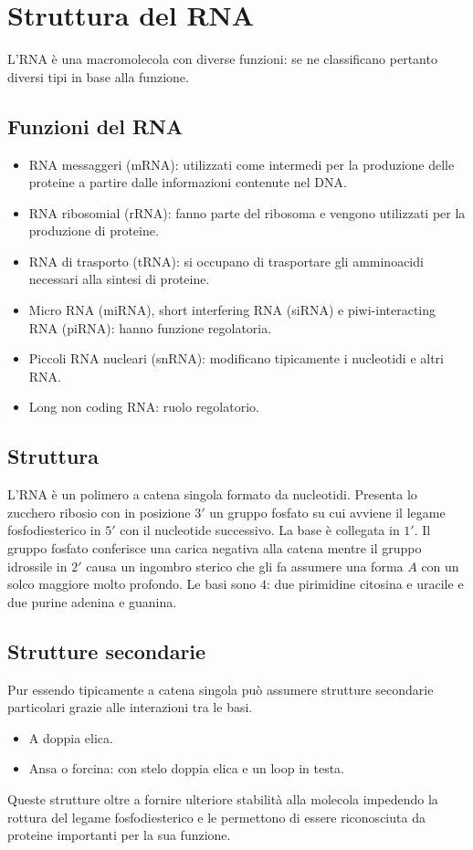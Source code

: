 \section{Struttura del RNA}
L'RNA \`e una macromolecola con diverse funzioni: se ne classificano pertanto diversi tipi in base alla funzione.

	\subsection{Funzioni del RNA}
	\begin{multicols}{2}
		\begin{itemize}
			\item RNA messaggeri (mRNA): utilizzati come intermedi per la produzione delle proteine a partire dalle informazioni contenute nel DNA.
			\item RNA ribosomial (rRNA): fanno parte del ribosoma e vengono utilizzati per la produzione di proteine.
			\item RNA di trasporto (tRNA): si occupano di trasportare gli amminoacidi necessari alla sintesi di proteine.
			\item Micro RNA (miRNA), short interfering RNA (siRNA) e piwi-interacting RNA (piRNA): hanno funzione regolatoria.
			\item Piccoli RNA nucleari (snRNA): modificano tipicamente i nucleotidi e altri RNA.
			\item Long non coding RNA: ruolo regolatorio. 
		\end{itemize}
	\end{multicols}

	\subsection{Struttura}
	L'RNA \`e un polimero a catena singola formato da nucleotidi. 
	Presenta lo zucchero ribosio con in posizione $3'$ un gruppo fosfato su cui avviene il legame fosfodiesterico in $5'$ con il
	nucleotide successivo. 
	La base \`e collegata in $1'$. 
	Il gruppo fosfato conferisce una carica negativa alla catena mentre il gruppo idrossile in $2'$ causa un ingombro sterico che gli fa assumere una forma $A$ con un solco maggiore molto profondo. 
	Le basi sono $4$: due pirimidine citosina e uracile e due purine adenina e guanina. 

	\subsection{Strutture secondarie}
	Pur essendo tipicamente a catena singola pu\`o assumere strutture secondarie particolari grazie alle interazioni tra le basi. 
	\begin{multicols}{2}
		\begin{itemize}
		\item A doppia elica.
		\item Ansa o forcina: con stelo doppia elica e un loop in testa.
	\end{itemize}
	\end{multicols}
	Queste strutture oltre a fornire ulteriore stabilit\`a alla molecola impedendo la rottura del legame fosfodiesterico e le permettono di essere riconosciuta da proteine importanti per la sua funzione. 

